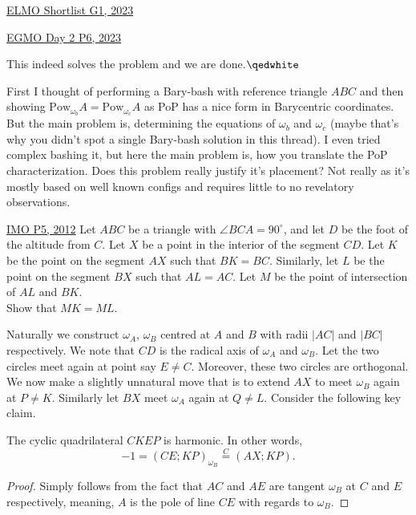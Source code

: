 \begin{problem}{14}{\href{https://artofproblemsolving.com/community/c6h3100572p28033718}{ELMO Shortlist G1, 2023}}
\begin{problem}{1}{\href{https://artofproblemsolving.com/community/c6h3054399p27522960}{EGMO Day 2 P6, 2023}}
\begin{solution}
	\noindent This indeed solves the problem and we are done.$\qedwhite$
	\begin{remark}[title=Comment.$\hspace{1mm}$]
	First I thought of performing a Bary-bash with reference triangle $ABC$ and then showing $\text{Pow}_{\omega_b}A=\text{Pow}_{\omega_c}A$ as PoP has a nice form in Barycentric coordinates. But the main problem is, determining the equations of $\omega_b$ and $\omega_c$ (maybe that's why you didn't spot a single Bary-bash solution in this thread). I even tried complex bashing it, but here the main problem is, how you translate the PoP characterization.
Does this problem really justify it's placement? Not really as it's mostly based on well known configs and requires little to no revelatory observations.
	\end{remark}
	\end{solution}
	\end{problem}

\begin{problem}{2}{\href{https://artofproblemsolving.com/community/c6h488511p2737425}{IMO P5, 2012}} 
	Let $ABC$ be a triangle with $\angle BCA=90^{\circ}$, and let $D$ be the foot of the altitude from $C$. Let $X$ be a point in the interior of the segment $CD$. Let $K$ be the point on the segment $AX$ such that $BK=BC$. Similarly, let $L$ be the point on the segment $BX$ such that $AL=AC$. Let $M$ be the point of intersection of $AL$ and $BK$.\\
	Show that $MK=ML$.
	\begin{solution} Naturally we construct $\omega_A$, $\omega_B$ centred at $A$ and $B$ with radii $|AC|$ and $|BC|$ respectively. We note that $CD$ is the radical axis of $\omega_A$ and $\omega_B$. Let the two circles meet again at point say $E\neq C$. Moreover, these two circles are orthogonal.\\
	\indent We now make a slightly unnatural move that is to extend $AX$ to meet $\omega_B$ again at $P\neq K$. Similarly let $BX$ meet $\omega_A$ again at $Q\neq L$. Consider the following key claim.

		\begin{numclaim}{1}
			The cyclic quadrilateral $CKEP$ is harmonic. In other words,
			$$-1=(CE; KP)_{\omega_B}\overset{C}{=}(AX; KP).$$
		\end{numclaim}
	\begin{proof}
		Simply follows from the fact that $AC$ and $AE$ are tangent $\omega_B$ at $C$ and $E$ respectively, meaning, $A$ is the pole of line $CE$ with regards to $\omega_B$.
	\end{proof}


\end{solution}
\end{problem}
\end{problem}
